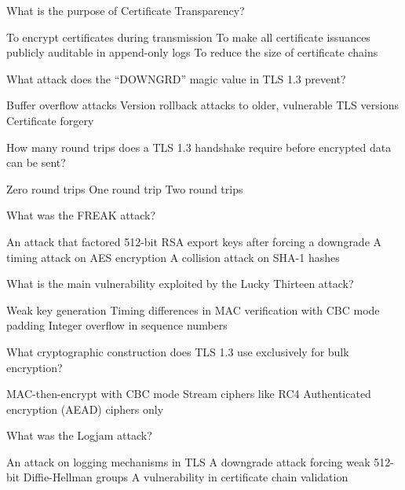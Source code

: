 \documentclass[10pt,a4paper,american]{exam}
\begin{document}
\begin{questions}
	\question What is the purpose of Certificate Transparency?
	\begin{randomizechoices}
		\choice To encrypt certificates during transmission
		\CorrectChoice To make all certificate issuances publicly auditable in append-only logs
		\choice To reduce the size of certificate chains
	\end{randomizechoices}

	\question What attack does the ``DOWNGRD'' magic value in TLS 1.3 prevent?
	\begin{randomizechoices}
		\choice Buffer overflow attacks
		\CorrectChoice Version rollback attacks to older, vulnerable TLS versions
		\choice Certificate forgery
	\end{randomizechoices}

	\question How many round trips does a TLS 1.3 handshake require before encrypted data can be sent?
	\begin{randomizechoices}
		\choice Zero round trips
		\CorrectChoice One round trip
		\choice Two round trips
	\end{randomizechoices}

	\question What was the FREAK attack?
	\begin{randomizechoices}
		\CorrectChoice An attack that factored 512-bit RSA export keys after forcing a downgrade
		\choice A timing attack on AES encryption
		\choice A collision attack on SHA-1 hashes
	\end{randomizechoices}

	\question What is the main vulnerability exploited by the Lucky Thirteen attack?
	\begin{randomizechoices}
		\choice Weak key generation
		\CorrectChoice Timing differences in MAC verification with CBC mode padding
		\choice Integer overflow in sequence numbers
	\end{randomizechoices}

	\question What cryptographic construction does TLS 1.3 use exclusively for bulk encryption?
	\begin{randomizechoices}
		\choice MAC-then-encrypt with CBC mode
		\choice Stream ciphers like RC4
		\CorrectChoice Authenticated encryption (AEAD) ciphers only
	\end{randomizechoices}

	\question What was the Logjam attack?
	\begin{randomizechoices}
		\choice An attack on logging mechanisms in TLS
		\CorrectChoice A downgrade attack forcing weak 512-bit Diffie-Hellman groups
		\choice A vulnerability in certificate chain validation
	\end{randomizechoices}


\end{questions}
\end{document}
